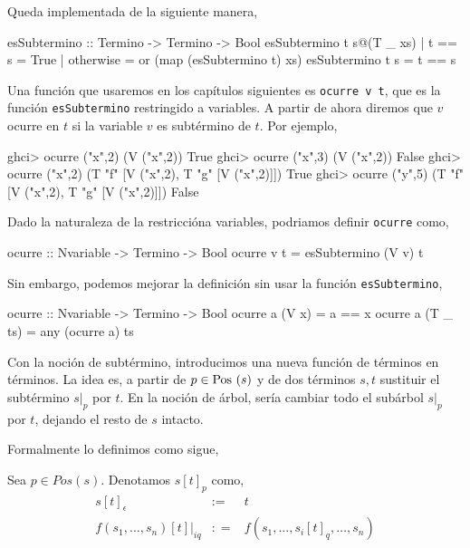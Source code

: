 Queda implementada de la siguiente manera,

\begin{codigo}
esSubtermino :: Termino -> Termino -> Bool
esSubtermino t s@(T _ xs)
    | t == s = True
    | otherwise = or (map (esSubtermino t) xs)
esSubtermino t s = t == s
\end{codigo}

Una función que usaremos en los capítulos siguientes es
\texttt{ocurre v t}, que es la función \texttt{esSubtermino}
restringido a variables. A partir de ahora diremos que $v$ ocurre en
$t$ si la variable $v$ es subtérmino de $t$. Por ejemplo,

\begin{sesion}
ghci> ocurre ("x",2) (V ("x",2)) 
True
ghci> ocurre ("x",3) (V ("x",2)) 
False
ghci> ocurre ("x",2) (T "f" [V ("x",2), T "g" [V ("x",2)]])
True
ghci> ocurre ("y",5) (T "f" [V ("x",2), T "g" [V ("x",2)]])
False
\end{sesion}

Dado la naturaleza de la restriccióna variables, podriamos definir
\texttt{ocurre} como,

\begin{codigo}
ocurre :: Nvariable -> Termino -> Bool
ocurre v t = esSubtermino (V v) t
\end{codigo}

Sin embargo, podemos mejorar la definición sin usar la función
\texttt{esSubtermino},

\begin{codigo}
ocurre :: Nvariable -> Termino -> Bool
ocurre a (V x)    = a == x
ocurre a (T _ ts) = any (ocurre a) ts
\end{codigo}

Con la noción de subtérmino, introducimos una nueva función de
términos en términos. La idea es, a partir de $p\in \mbox{Pos }(s)$ y de dos
términos $s,t$ sustituir el subtérmino $s|_p$ por $t$. En la
noción de árbol, sería cambiar todo el subárbol $s|_p$ por $t$,
dejando el resto de $s$ intacto. 



Formalmente lo definimos como sigue,

\begin{defi}
Sea $p \in Pos(s)$. Denotamos $s[t]_p$ como,
  \begin{equation*}
    \begin{array}{rcl}
      s[t]_\epsilon & :=  & t \\
      f(s_1,\dots,s_n)[t]|_{iq} & : = & f(s_1,\dots,s_i[t]_q,\dots,s_n) \\
    \end{array}
  \end{equation*}
\end{defi}

